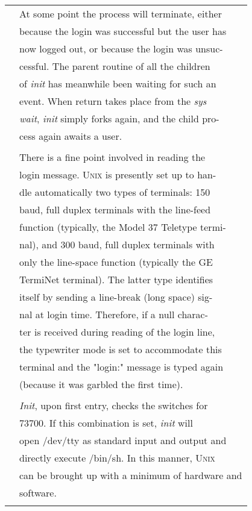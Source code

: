 \documentclass{article}
\newenvironment{manpage}{\ttfamily}{\par}
\begin{document}
\begin{manpage}
\begin{longtable}{ll}
		& At some point the process will terminate, either\\
		& because the login was successful but the user has\\
		& now logged out, or because the login was unsuc-\\
		& cessful. The parent routine of all the children\\
		& of \textit{init} has meanwhile been waiting for such an\\
		& event. When return takes place from the \textit{sys}\\
		& \textit{wait}, \textit{init} simply forks again, and the child pro-\\
		& cess again awaits a user.\\\\
		
		& There is a fine point involved in reading the\\
		& login message. U\textsc{nix} is presently set up to han-\\
		& dle automatically two types of terminals: 150\\
		& baud, full duplex terminals with the line-feed\\
		& function (typically, the Model 37 Teletype termi-\\
		& nal), and 300 baud, full duplex terminals with\\
		& only the line-space function (typically the GE\\
		& TermiNet terminal). The latter type identifies\\
		& itself by sending a line-break (long space) sig-\\
		& nal at login time. Therefore, if a null charac-\\
		& ter is received during reading of the login line,\\
		& the typewriter mode is set to accommodate this\\
		& terminal and the "login:" message is typed again\\
		& (because it was garbled the first time).\\\\
		
		& \textit{Init}, upon first entry, checks the switches for\\
		& 73700. If this combination is set, \textit{init} will\\
		& open /dev/tty as standard input and output and\\
		& directly execute /bin/sh. In this manner, U\textsc{nix}\\
		& can be brought up with a minimum of hardware and\\
		& software.\\\\
		

\end{longtable}
\end{manpage}
\end{document}
